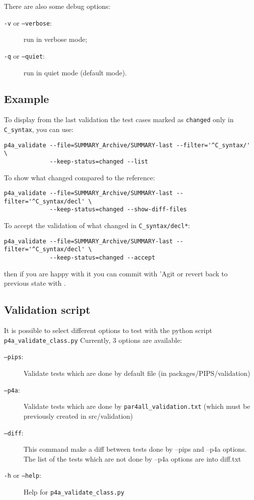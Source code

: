 \documentclass[a4paper]{article}
\begin{document}
There are also some debug options:
\begin{description}
\item[\texttt{-v} or \texttt{--verbose}:] run in verbose mode;

\item[\texttt{-q} or \texttt{--quiet}:] run in quiet mode (default mode).
\end{description}


\subsection{Example}
\label{sec:example}

To display from the last validation the test cases marked as
\texttt{changed} only in \verb|C_syntax|, you can use:
\begin{verbatim}
p4a_validate --file=SUMMARY_Archive/SUMMARY-last --filter='^C_syntax/' \
             --keep-status=changed --list
\end{verbatim}

To show what changed compared to the reference:
\begin{verbatim}
p4a_validate --file=SUMMARY_Archive/SUMMARY-last --filter='^C_syntax/decl' \
             --keep-status=changed --show-diff-files
\end{verbatim}

To accept the validation of what changed in \texttt{C\_syntax/decl\emph{*}}:
\begin{verbatim}
p4a_validate --file=SUMMARY_Archive/SUMMARY-last --filter='^C_syntax/decl' \
             --keep-status=changed --accept
\end{verbatim}
then if you are happy with it you can commit with 'Agit or revert back to
previous state with \Agit.

\subsection{Validation script}
\label{sec:validation_script}

It is possible to select different options to test with the python script \verb|p4a_validate_class.py|
Currently, 3 options are available:

\begin{description}
\item[\texttt{--pips}:] Validate tests which are done by default file (in packages/PIPS/validation)

\item[\texttt{--p4a}:] Validate tests which are done by \verb|par4all_validation.txt| (which must be previously created in src/validation)

\item[\texttt{--diff}:] This command make a diff between tests done by --pips and --p4a options. The list of the tests which are not done by --p4a options are into diff.txt

\item[\texttt{-h} or \texttt{--help}:] Help for \verb|p4a_validate_class.py|
\end{description}
\end{document}
